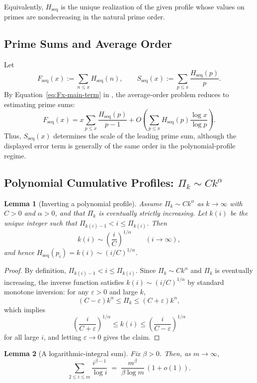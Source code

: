 \documentclass[11pt]{article}
\newtheorem{lemma}{Lemma}
\theoremstyle{definition}
\newcommand{\height}{H}
\begin{document}
Equivalently, $\height_{\mathrm{seq}}$ is the unique realization of the given profile whose values
on primes are nondecreasing in the natural prime order.

\subsection{Prime Sums and Average Order}
Let
\[
F_{\mathrm{seq}}(x):=\sum_{n\le x}\height_{\mathrm{seq}}(n),
\qquad
S_{\mathrm{seq}}(x):=\sum_{p\le x}\frac{\height_{\mathrm{seq}}(p)}{p}.
\]
By Equation~\eqref{eq:Fx-main-term} in , the average-order problem reduces
to estimating prime sums:
\[
F_{\mathrm{seq}}(x)
=
x\sum_{p\le x}\frac{\height_{\mathrm{seq}}(p)}{p-1}
+
O\!\left(
  \sum_{p\le x}\height_{\mathrm{seq}}(p)\frac{\log x}{\log p}
\right).
\]
Thus, \(S_{\mathrm{seq}}(x)\) determines the scale of the leading prime sum,
although the displayed error term is generally of the same order in the
polynomial-profile regime.

\subsection{Polynomial Cumulative Profiles: $\Pi_k\sim Ck^\alpha$}

\begin{lemma}[Inverting a polynomial profile]\label{lem:invertPi}
Assume $\Pi_k\sim Ck^\alpha$ as $k\to\infty$ with $C>0$ and $\alpha>0$, and that $\Pi_k$ is eventually
strictly increasing.  Let $k(i)$ be the unique integer such that $\Pi_{k(i)-1}< i\le \Pi_{k(i)}$.
Then
\[
k(i)\sim \left(\frac{i}{C}\right)^{1/\alpha}\qquad (i\to\infty),
\]
and hence $\height_{\mathrm{seq}}(p_i)=k(i)\sim (i/C)^{1/\alpha}$.
\end{lemma}

\begin{proof}
By definition, $\Pi_{k(i)-1}<i\le \Pi_{k(i)}$.  Since $\Pi_k\sim Ck^\alpha$ and $\Pi_k$ is eventually
increasing, the inverse function satisfies $k(i)\sim (i/C)^{1/\alpha}$ by standard monotone inversion:
for any $\varepsilon>0$ and large $k$,
\[
(C-\varepsilon)k^\alpha \le \Pi_k \le (C+\varepsilon)k^\alpha,
\]
which implies
\[
\left(\frac{i}{C+\varepsilon}\right)^{1/\alpha}\le k(i)\le
\left(\frac{i}{C-\varepsilon}\right)^{1/\alpha}
\]
for all large $i$, and letting $\varepsilon\to 0$ gives the claim.
\end{proof}

\begin{lemma}[A logarithmic-integral sum]\label{lem:logint-sum}
Fix $\beta>0$. Then, as $m\to\infty$,
\[
\sum_{2\le i\le m}\frac{i^{\beta-1}}{\log i}
\;=\;
\frac{m^\beta}{\beta\log m}\,(1+o(1)).
\]
\end{lemma}
\end{document}
